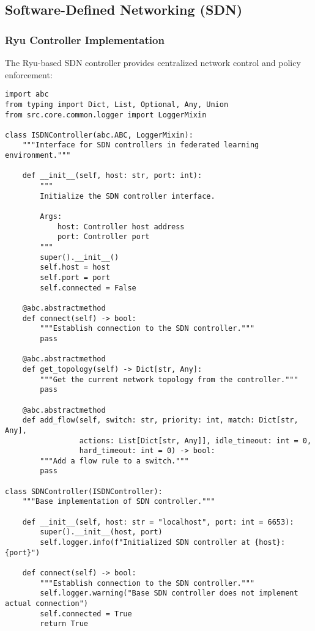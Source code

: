 \subsection{Software-Defined Networking (SDN)}

\subsubsection{Ryu Controller Implementation}

The Ryu-based SDN controller \cite{ryu} provides centralized network control and policy enforcement:

\begin{lstlisting}[style=pythoncode, caption=SDN Controller Implementation]
import abc
from typing import Dict, List, Optional, Any, Union
from src.core.common.logger import LoggerMixin

class ISDNController(abc.ABC, LoggerMixin):
    """Interface for SDN controllers in federated learning environment."""
    
    def __init__(self, host: str, port: int):
        """
        Initialize the SDN controller interface.
        
        Args:
            host: Controller host address
            port: Controller port
        """
        super().__init__()
        self.host = host
        self.port = port
        self.connected = False
        
    @abc.abstractmethod
    def connect(self) -> bool:
        """Establish connection to the SDN controller."""
        pass
        
    @abc.abstractmethod
    def get_topology(self) -> Dict[str, Any]:
        """Get the current network topology from the controller."""
        pass
        
    @abc.abstractmethod
    def add_flow(self, switch: str, priority: int, match: Dict[str, Any], 
                 actions: List[Dict[str, Any]], idle_timeout: int = 0, 
                 hard_timeout: int = 0) -> bool:
        """Add a flow rule to a switch."""
        pass

class SDNController(ISDNController):
    """Base implementation of SDN controller."""
    
    def __init__(self, host: str = "localhost", port: int = 6653):
        super().__init__(host, port)
        self.logger.info(f"Initialized SDN controller at {host}:{port}")
    
    def connect(self) -> bool:
        """Establish connection to the SDN controller."""
        self.logger.warning("Base SDN controller does not implement actual connection")
        self.connected = True
        return True
        

\end{lstlisting}
